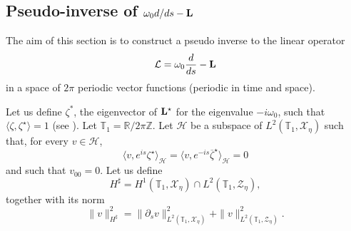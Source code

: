\documentclass[11pt]{article}
\begin{document}








\subsection{Pseudo-inverse of $\omega_0 d/ds - {\bf L}$}





The aim of this section is to construct a pseudo inverse to the linear operator
$$
\mathcal{L} = \omega_0 {d \over ds} - {\bf L}
$$ 
in a space of $2 \pi$ periodic vector functions (periodic in time and space).

Let us define $\zeta^*$, the eigenvector of ${\bf L}^\star$
for the eigenvalue $- i \omega_0$, such that 
$\langle \zeta, \zeta^\star \rangle = 1$ (see \cite{Kato}).
Let $\mathbb{T}_1 = \mathbb{R} / 2 \pi \mathbb{Z}$.
Let $\mathcal{H}$ be a subspace of $L^2(\mathbb{T}_1, \mathcal{X}_\eta)$ such that, for every $v \in \mathcal{H}$,
$$
\langle v, e^{i s} \zeta^\star \rangle_{\mathcal{H}} =
\langle v, e^{- i s} \overline{\zeta}^\star \rangle_{\mathcal{H}}
= 0
$$
and such that $v_{00} = 0$. 
Let us define
$$
H^\sharp = H^1(\mathbb{T}_1,\mathcal{X}_\eta)
\cap L^2(\mathbb{T}_1, \mathcal{Z}_\eta),
$$
together with its norm
$$
\| v \|_{H^\sharp}^2 = \| \partial_s v \|_{L^2(\mathbb{T}_1,\mathcal{X}_\eta)}^2 + \| v \|_{L^2(\mathbb{T}_1, \mathcal{Z}_\eta)}^2.
$$
\end{document}
